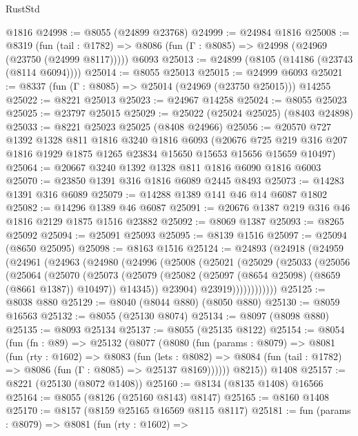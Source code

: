 \begin{lexlean}{RustStd}
\begin{coremodule}
    @1816
@24998 := @8055 (@24899 @23768)
@24999 := @24984 @1816
@25008 := @8319
    (fun (tail : @1782) => @8086 (fun (Γ : @8085) => @24998 (@24969 (@23750 (@24999 @8117)))))
    @6093
@25013 := @24899 (@8105 (@14186 (@23743 (@8114 @6094))))
@25014 := @8055 @25013
@25015 := @24999 @6093
@25021 := @8337 (fun (Γ : @8085) => @25014 (@24969 (@23750 @25015))) @14255
@25022 := @8221 @25013
@25023 := @24967 @14258
@25024 := @8055 @25023
@25025 := @23797 @25015
@25029 := @25022 (@25024 @25025) (@8403 @24898)
@25033 := @8221 @25023 @25025 (@8408 @24966)
@25056 := @20570
    @727
    @1392
    @1328
    @811
    @1816
    @3240
    @1816
    @6093
    (@20676 @725 @219 @316 @207 @1816 @1929 @1875 @1265 @23834 @15650 @15653 @15656 @15659 @10497)
@25064 := @20667 @3240 @1392 @1328 @811 @1816 @6090 @1816 @6003
@25070 := @23850 @1391 @316 @1816 @6089 @2445 @8493
@25073 := @14283 @1391 @316 @6089
@25079 := @14288 @1389 @141 @46 @14 @6087 @1802
@25082 := @14296 @1389 @46 @6087
@25091 := @20676 @1387 @219 @316 @46 @1816 @2129 @1875 @1516 @23882
@25092 := @8069 @1387
@25093 := @8265 @25092
@25094 := @25091 @25093
@25095 := @8139 @1516
@25097 := @25094 (@8650 @25095)
@25098 := @8163 @1516
@25124 := @24893
    (@24918
      (@24959
        (@24961
          (@24963
            (@24980
              (@24996
                (@25008
                  (@25021
                    (@25029
                      (@25033
                        (@25056
                          (@25064
                            (@25070
                              (@25073
                                (@25079
                                  (@25082 (@25097 (@8654 @25098) (@8659 (@8661 @1387)) @10497))
                                  @14345))
                              @23904)
                            @23919))))))))))))
@25125 := @8038 @880
@25129 := @8040 (@8044 @880) (@8050 @880)
@25130 := @8059 @16563
@25132 := @8055 (@25130 @8074)
@25134 := @8097 (@8098 @880)
@25135 := @8093 @25134
@25137 := @8055 (@25135 @8122)
@25154 := @8054
    (fun (fn : @89) =>
    @25132
      (@8077
        (@8080
          (fun (params : @8079) =>
          @8081
            (fun (rty : @1602) =>
            @8083
              (fun (lets : @8082) =>
              @8084 (fun (tail : @1782) => @8086 (fun (Γ : @8085) => @25137 @8169))))))
        @8215))
    @1408
@25157 := @8221 (@25130 (@8072 @1408))
@25160 := @8134 (@8135 @1408) @16566
@25164 := @8055 (@8126 (@25160 @8143) @8147)
@25165 := @8160 @1408
@25170 := @8157 (@8159 @25165 @16569 @8115 @8117)
@25181 := fun (params : @8079) =>
  @8081
    (fun (rty : @1602) =>

\end{coremodule}
\end{lexlean}
